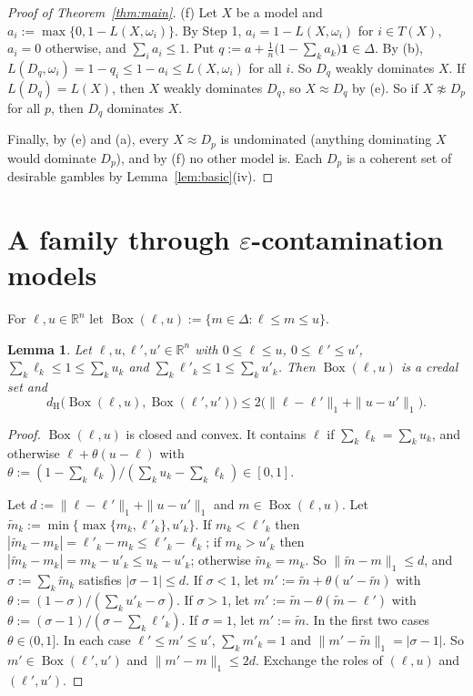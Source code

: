 \documentclass[11pt]{article}
\newtheorem{lemma}[theorem]{Lemma}
\theoremstyle{definition}
\newcommand{\R}{\mathbb R}
\newcommand{\one}{\mathbf 1}
\newcommand{\dH}{d_{\mathrm H}}
\newcommand{\Bx}{\operatorname{Box}}
\begin{document}
\begin{proof}[Proof of Theorem~\ref{thm:main}]
(f) Let $X$ be a model and $a_i:=\max\{0,1-L(X,\omega_i)\}$. By Step 1, $a_i=1-L(X,\omega_i)$ for $i\in T(X)$, $a_i=0$ otherwise, and $\sum_ia_i\le1$. Put $q:=a+\frac1n\big(1-\sum_ka_k\big)\one\in\Delta$. By (b), $L(D_q,\omega_i)=1-q_i\le1-a_i\le L(X,\omega_i)$ for all $i$. So $D_q$ weakly dominates $X$. If $L(D_q)=L(X)$, then $X$ weakly dominates $D_q$, so $X\approx D_q$ by (e). So if $X\not\approx D_p$ for all $p$, then $D_q$ dominates $X$.

Finally, by (e) and (a), every $X\approx D_p$ is undominated (anything dominating $X$ would dominate $D_p$), and by (f) no other model is. Each $D_p$ is a coherent set of desirable gambles by Lemma~\ref{lem:basic}(iv).
\end{proof}

\section{A family through \texorpdfstring{$\varepsilon$}{epsilon}-contamination models}\label{sec:family}

For $\ell,u\in\R^n$ let $\Bx(\ell,u):=\{m\in\Delta:\ell\le m\le u\}$.

\begin{lemma}\label{lem:box}
Let $\ell,u,\ell',u'\in\R^n$ with $0\le\ell\le u$, $0\le\ell'\le u'$, $\sum_k\ell_k\le1\le\sum_ku_k$ and $\sum_k\ell'_k\le1\le\sum_ku'_k$. Then $\Bx(\ell,u)$ is a credal set and
\[
\dH\big(\Bx(\ell,u),\Bx(\ell',u')\big)\le2\big(\|\ell-\ell'\|_1+\|u-u'\|_1\big).
\]
\end{lemma}

\begin{proof}
$\Bx(\ell,u)$ is closed and convex. It contains $\ell$ if $\sum_k\ell_k=\sum_ku_k$, and otherwise $\ell+\theta(u-\ell)$ with $\theta:=(1-\sum_k\ell_k)/(\sum_ku_k-\sum_k\ell_k)\in[0,1]$.

Let $d:=\|\ell-\ell'\|_1+\|u-u'\|_1$ and $m\in\Bx(\ell,u)$. Let $\tilde m_k:=\min\{\max\{m_k,\ell'_k\},u'_k\}$. If $m_k<\ell'_k$ then $|\tilde m_k-m_k|=\ell'_k-m_k\le\ell'_k-\ell_k$; if $m_k>u'_k$ then $|\tilde m_k-m_k|=m_k-u'_k\le u_k-u'_k$; otherwise $\tilde m_k=m_k$. So $\|\tilde m-m\|_1\le d$, and $\sigma:=\sum_k\tilde m_k$ satisfies $|\sigma-1|\le d$. If $\sigma<1$, let $m':=\tilde m+\theta(u'-\tilde m)$ with $\theta:=(1-\sigma)/(\sum_ku'_k-\sigma)$. If $\sigma>1$, let $m':=\tilde m-\theta(\tilde m-\ell')$ with $\theta:=(\sigma-1)/(\sigma-\sum_k\ell'_k)$. If $\sigma=1$, let $m':=\tilde m$. In the first two cases $\theta\in(0,1]$. In each case $\ell'\le m'\le u'$, $\sum_km'_k=1$ and $\|m'-\tilde m\|_1=|\sigma-1|$. So $m'\in\Bx(\ell',u')$ and $\|m'-m\|_1\le2d$. Exchange the roles of $(\ell,u)$ and $(\ell',u')$.
\end{proof}
\end{document}
